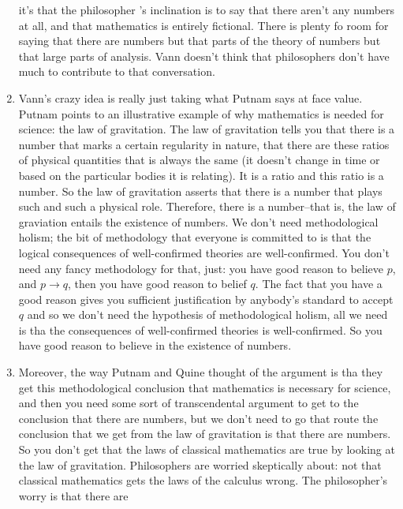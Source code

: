 \documentclass[12pt]{article}
\theoremstyle{definition}
\begin{document}
\begin{enumerate}
        it's that the philosopher 's inclination is to say that there aren't
        any numbers at all, and that mathematics is entirely fictional. There
        is plenty fo room for saying that there are numbers but that parts of
        the theory of numbers but that large parts of analysis. Vann doesn't
        think that philosophers don't have much to contribute to that
        conversation.
    \item
        Vann's crazy idea is really just taking what Putnam says at face value.
        Putnam points to an illustrative example of why mathematics is needed
        for science: the law of gravitation. The law of gravitation tells you
        that there is a number that marks a certain regularity in nature, that
        there are these ratios of physical quantities that is always the same
        (it doesn't change in time or based on the particular bodies it is
        relating). It is a ratio and this ratio is a number. So the law of
        gravitation asserts that there is a number that plays such and such a
        physical role. Therefore, there is a number--that is, the law of
        graviation entails the existence of numbers. We don't need
        methodological holism; the bit of methodology that everyone is
        committed to is that the logical consequences of well-confirmed
        theories are well-confirmed. You don't need any fancy methodology for
        that, just: you have good reason to believe $p$, and $p \rightarrow q$,
        then you have good reason to belief $q$. The fact that you have a good
        reason gives you sufficient justification by anybody's standard to
        accept $q$ and so we don't need the hypothesis of methodological
        holism, all we need is tha the consequences of well-confirmed theories
        is well-confirmed. So you have good reason to believe in the existence
        of numbers.
    \item
        Moreover, the way Putnam and Quine thought of the argument is tha they
        get this methodological conclusion that mathematics is necessary for
        science, and then you need some sort of transcendental argument to get
        to the conclusion that there are numbers, but we don't need to go that
        route the conclusion that we get from the law of gravitation is that
        there are numbers. So you don't get that the laws of classical
        mathematics are true by looking at the law of gravitation. Philosophers
        are worried skeptically about: not that classical mathematics gets the
        laws of the calculus wrong. The philosopher's worry is that there are

\end{enumerate}
\end{document}

